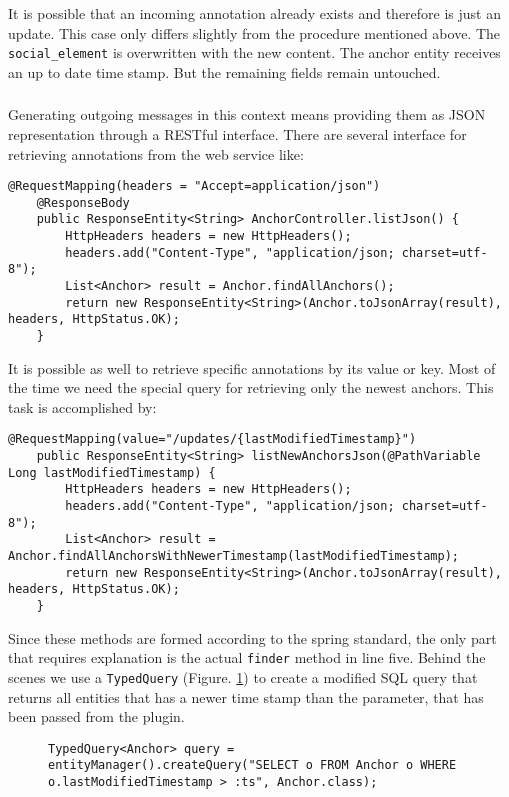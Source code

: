 It is possible that an incoming annotation already exists and therefore is just an update. This case only differs slightly from the procedure mentioned above. The \verb^social_element^ is overwritten with the new content. The anchor entity receives an up to date time stamp. But the remaining fields remain untouched. 

\subsubsection[Generating Messages]{\reqWSvii}\label{reqWSvii}
Generating outgoing messages in this context means providing them as JSON representation through a RESTful interface. There are several interface for retrieving annotations from the web service like:
\begin{lstlisting}
@RequestMapping(headers = "Accept=application/json")
    @ResponseBody
    public ResponseEntity<String> AnchorController.listJson() {
        HttpHeaders headers = new HttpHeaders();
        headers.add("Content-Type", "application/json; charset=utf-8");
        List<Anchor> result = Anchor.findAllAnchors();
        return new ResponseEntity<String>(Anchor.toJsonArray(result), headers, HttpStatus.OK);
    }
\end{lstlisting}
It is possible as well to retrieve specific annotations by its value or key. Most of the time we need the special query for retrieving only the newest anchors. This task is accomplished by:

\begin{lstlisting}
@RequestMapping(value="/updates/{lastModifiedTimestamp}")
    public ResponseEntity<String> listNewAnchorsJson(@PathVariable Long lastModifiedTimestamp) {
        HttpHeaders headers = new HttpHeaders();
        headers.add("Content-Type", "application/json; charset=utf-8");
        List<Anchor> result = Anchor.findAllAnchorsWithNewerTimestamp(lastModifiedTimestamp);
        return new ResponseEntity<String>(Anchor.toJsonArray(result), headers, HttpStatus.OK);
    }
\end{lstlisting}

Since these methods are formed according to the spring standard, the only part that requires explanation is the actual \verb^finder^ method in line five. Behind the scenes we use a \verb^TypedQuery^ (Figure. \ref{typed-query}) to create a modified SQL query that returns all entities that has a newer time stamp than the parameter, that has been passed from the plugin.

\begin{figure}\centering
\begin{lstlisting}
TypedQuery<Anchor> query = entityManager().createQuery("SELECT o FROM Anchor o WHERE o.lastModifiedTimestamp > :ts", Anchor.class);
\end{lstlisting}
\label{typed-query}
\end{figure} 

